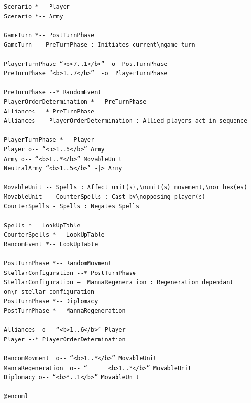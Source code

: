 \documentclass[12pt,a4paper]{article}
\begin{document}
\begin{verbatim}
Scenario *-- Player
Scenario *-- Army

GameTurn *-- PostTurnPhase 
GameTurn -- PreTurnPhase : Initiates current\ngame turn 

PlayerTurnPhase “<b>7..1</b>” -o  PostTurnPhase
PreTurnPhase “<b>1..7</b>”  -o  PlayerTurnPhase

PreTurnPhase --* RandomEvent
PlayerOrderDetermination *-- PreTurnPhase
Alliances --* PreTurnPhase
Alliances -- PlayerOrderDetermination : Allied players act in sequence

PlayerTurnPhase *-- Player
Player o-- “<b>1..6</b>” Army
Army o-- “<b>1..*</b>” MovableUnit
NeutralArmy “<b>1..5</b>” -|> Army

MovableUnit -- Spells : Affect unit(s),\nunit(s) movement,\nor hex(es)  
MovableUnit -- CounterSpells : Cast by\nopposing player(s)
CounterSpells - Spells : Negates Spells

Spells *-- LookUpTable
CounterSpells *-- LookUpTable
RandomEvent *-- LookUpTable

PostTurnPhase *-- RandomMovment
StellarConfiguration --* PostTurnPhase
StellarConfiguration –  MannaRegeneration : Regeneration dependant on\n stellar configuration
PostTurnPhase *-- Diplomacy
PostTurnPhase *-- MannaRegeneration

Alliances  o-- “<b>1..6</b>” Player
Player --* PlayerOrderDetermination

RandomMovment  o-- “<b>1..*</b>” MovableUnit 
MannaRegeneration  o-- “      <b>1..*</b>” MovableUnit
Diplomacy o-- “<b>*..1</b>” MovableUnit

@enduml
\end{verbatim}
\end{document}
